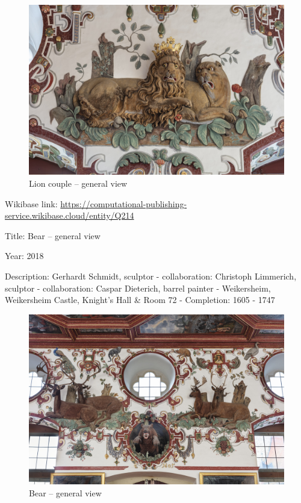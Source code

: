 \documentclass[
  letterpaper,
]{book}
\begin{document}
\begin{figure}[H]

{\centering \includegraphics{impressum_files/mediabag/fmd10005864a.jpg}

}

\caption{Lion couple -- general view}

\end{figure}%

Wikibase link:
\url{https://computational-publishing-service.wikibase.cloud/entity/Q214}

Title: Bear -- general view

Year: 2018

Description: Gerhardt Schmidt, sculptor - collaboration: Christoph
Limmerich, sculptor - collaboration: Caspar Dieterich, barrel painter -
Weikersheim, Weikersheim Castle, Knight's Hall \& Room 72 - Completion:
1605 - 1747

\begin{figure}[H]

{\centering \includegraphics{impressum_files/mediabag/fmd10005865a.jpg}

}

\caption{Bear -- general view}

\end{figure}%
\end{document}
